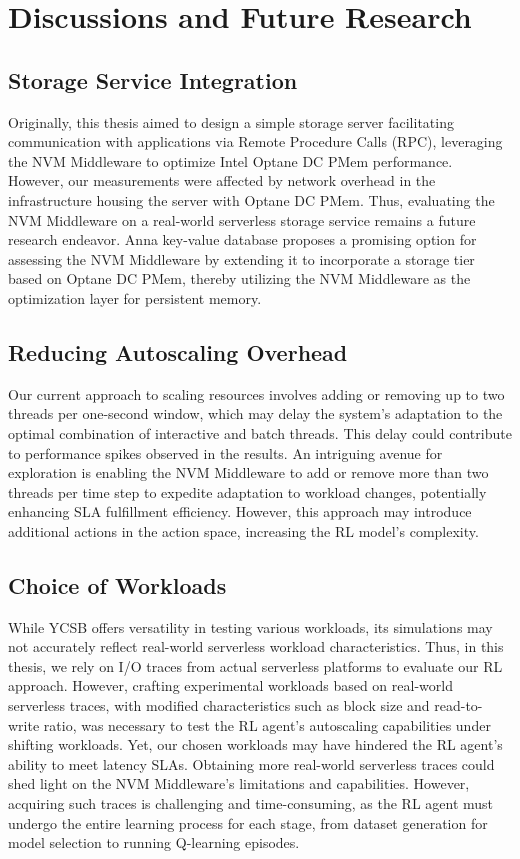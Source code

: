 \chapter{Discussions and Future Research}

\section*{Storage Service Integration}

Originally, this thesis aimed to design a simple storage server facilitating communication with applications via Remote Procedure Calls (RPC), leveraging the NVM Middleware to optimize Intel Optane DC PMem performance. However, our measurements were affected by network overhead in the infrastructure housing the server with Optane DC PMem. Thus, evaluating the NVM Middleware on a real-world serverless storage service remains a future research endeavor. Anna key-value database \cite{wu2019anna} proposes a promising option for assessing the NVM Middleware by extending it to incorporate a storage tier based on Optane DC PMem, thereby utilizing the NVM Middleware as the optimization layer for persistent memory.

\section*{Reducing Autoscaling Overhead}

Our current approach to scaling resources involves adding or removing up to two threads per one-second window, which may delay the system's adaptation to the optimal combination of interactive and batch threads. This delay could contribute to performance spikes observed in the results. An intriguing avenue for exploration is enabling the NVM Middleware to add or remove more than two threads per time step to expedite adaptation to workload changes, potentially enhancing SLA fulfillment efficiency. However, this approach may introduce additional actions in the action space, increasing the RL model's complexity.

\section*{Choice of Workloads}

While YCSB offers versatility in testing various workloads, its simulations may not accurately reflect real-world serverless workload characteristics. Thus, in this thesis, we rely on I/O traces from actual serverless platforms to evaluate our RL approach. However, crafting experimental workloads based on real-world serverless traces, with modified characteristics such as block size and read-to-write ratio, was necessary to test the RL agent's autoscaling capabilities under shifting workloads. Yet, our chosen workloads may have hindered the RL agent's ability to meet latency SLAs. Obtaining more real-world serverless traces could shed light on the NVM Middleware's limitations and capabilities. However, acquiring such traces is challenging and time-consuming, as the RL agent must undergo the entire learning process for each stage, from dataset generation for model selection to running Q-learning episodes.

